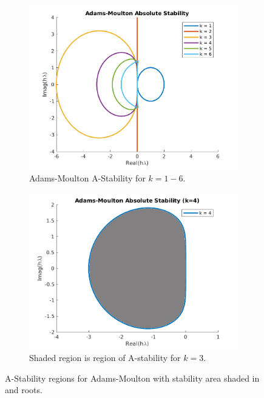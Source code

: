 \documentclass[12pt]{article}
\theoremstyle{remark}
\begin{document}
\begin{figure}[H]
	\centering
	\begin{subfigure}{.55\textwidth}
		\centering
		\includegraphics[width=1\linewidth]{5_2_5.png}
		\caption{Adams-Moulton A-Stability for $k = 1-6.$}
		\label{fig:sub1}
	\end{subfigure}%
	\begin{subfigure}{.55\textwidth}
		\centering
		\includegraphics[width=1\linewidth]{5_2_5_single.png}
		\caption{Shaded region is region of A-stability for $k = 3.$}
		\label{fig:sub2}
	\end{subfigure}
	\caption{A-Stability regions for Adams-Moulton  with stability area shaded in and roots.}
	\label{fig:test}
\end{figure}
\end{document}

